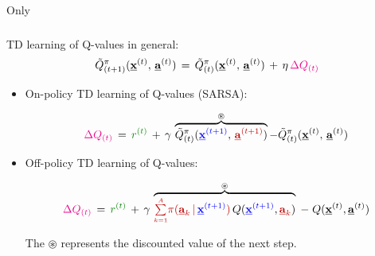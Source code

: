 \begin{frame}{Only} \frametitle{\subsecname}
	
	TD learning of Q-values in general:
	\begin{equation}
			\tilde{Q}^\pi_{(t+1)}(\vec x^{(t)},\, \vec a^{(t)} )
			\,= \,
			\tilde{Q}^\pi_{(t)} ( \vec x^{(t)},\, \vec a^{(t)} ) \, + \, \eta \, {\color{magenta}\Delta Q_{(t)}}
	\end{equation}
	
	
	
	\begin{itemize}
		\item<only@2> On-policy TD learning of Q-values (SARSA):
		
		\begin{equation}
				{\color{magenta}\Delta Q_{(t)}} \,=\, {\color{reward} r^{(t)}} \, + \, \gamma \, \overbrace{\tilde{Q}^\pi_{(t)} ({\color{trans}  \vec x^{(t+1)}},\,{\color{policy}  \vec a^{(t+1)}} )}^{\circledast} - \tilde{Q}^\pi_{(t)} ( \vec x^{(t)},\, \vec a^{(t)} )
				\label{eq:deltaqONpolicy}
		\end{equation}
		
		\item<only@2,3> Off-policy TD learning of Q-values:
		
		\slidesonly{\vspace{-5mm}}
		
		\begin{equation}
					{\color{magenta}\Delta Q_{(t)}} \,=\, {\color{reward}r^{(t)}} 
				 \, + \, \gamma \, \overbrace{{\color{policy}\smallsum{k=1}{A}
					\pi(\vec a_k \,|\, {\color{trans}\vec x^{(t+1)}})} \,
					Q({\color{trans}\vec x^{(t+1)}}, {\color{policy}\vec a_k})}^{\circledast} 
				\;-\; Q(\vec x^{(t)}, \vec a^{(t)})
				\label{eq:deltaqOFFpolicy}
		\end{equation}
		
		The $\circledast$ represents the discounted value of the next step.
		

\end{itemize}
\end{frame}
